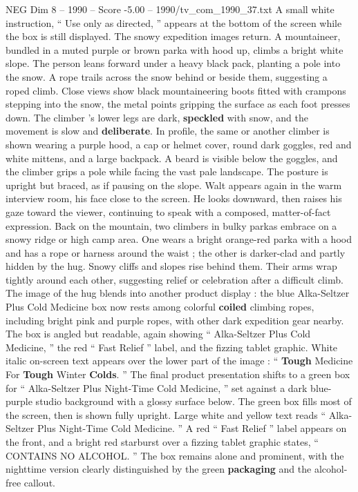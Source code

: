 \begin{textsample}{NEG Dim 8 – 1990 – Score -5.00 – 1990/tv\_com\_1990\_37.txt}
A small white instruction, “ Use only as directed, ” appears at the bottom of the screen while the box is still displayed.
The snowy expedition images return.
A mountaineer, bundled in a muted purple or brown parka with hood up, climbs a bright white slope.
The person leans forward under a heavy black pack, planting a pole into the snow.
A rope trails across the snow behind or beside them, suggesting a roped climb.
Close views show black mountaineering boots fitted with crampons stepping into the snow, the metal points gripping the surface as each foot presses down.
The climber ’s lower legs are dark, \textbf{speckled} with snow, and the movement is slow and \textbf{deliberate}.
In profile, the same or another climber is shown wearing a purple hood, a cap or helmet cover, round dark goggles, red and white mittens, and a large backpack.
A beard is visible below the goggles, and the climber grips a pole while facing the vast pale landscape.
The posture is upright but braced, as if pausing on the slope.
Walt appears again in the warm interview room, his face close to the screen.
He looks downward, then raises his gaze toward the viewer, continuing to speak with a composed, matter-of-fact expression.
Back on the mountain, two climbers in bulky parkas embrace on a snowy ridge or high camp area.
One wears a bright orange-red parka with a hood and has a rope or harness around the waist ; the other is darker-clad and partly hidden by the hug.
Snowy cliffs and slopes rise behind them.
Their arms wrap tightly around each other, suggesting relief or celebration after a difficult climb.
The image of the hug blends into another product display : the blue Alka-Seltzer Plus Cold Medicine box now rests among colorful \textbf{coiled} climbing ropes, including bright pink and purple ropes, with other dark expedition gear nearby.
The box is angled but readable, again showing “ Alka-Seltzer Plus Cold Medicine, ” the red “ Fast Relief ” label, and the fizzing tablet graphic.
White italic on-screen text appears over the lower part of the image : “ \textbf{Tough} Medicine For \textbf{Tough} Winter \textbf{Colds}. ” The final product presentation shifts to a green box for “ Alka-Seltzer Plus Night-Time Cold Medicine, ” set against a dark blue-purple studio background with a glossy surface below.
The green box fills most of the screen, then is shown fully upright.
Large white and yellow text reads “ Alka-Seltzer Plus Night-Time Cold Medicine. ” A red “ Fast Relief ” label appears on the front, and a bright red starburst over a fizzing tablet graphic states, “ CONTAINS NO ALCOHOL. ” The box remains alone and prominent, with the nighttime version clearly distinguished by the green \textbf{packaging} and the alcohol-free callout.

\end{textsample}
